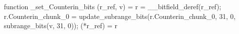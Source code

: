 function _set_Counterin_bits (r_ref, v) = {
    r = __bitfield_deref(r_ref);
    r.Counterin_chunk_0 = update_subrange_bits(r.Counterin_chunk_0, 31, 0, subrange_bits(v, 31, 0));
    (*r_ref) = r
}
